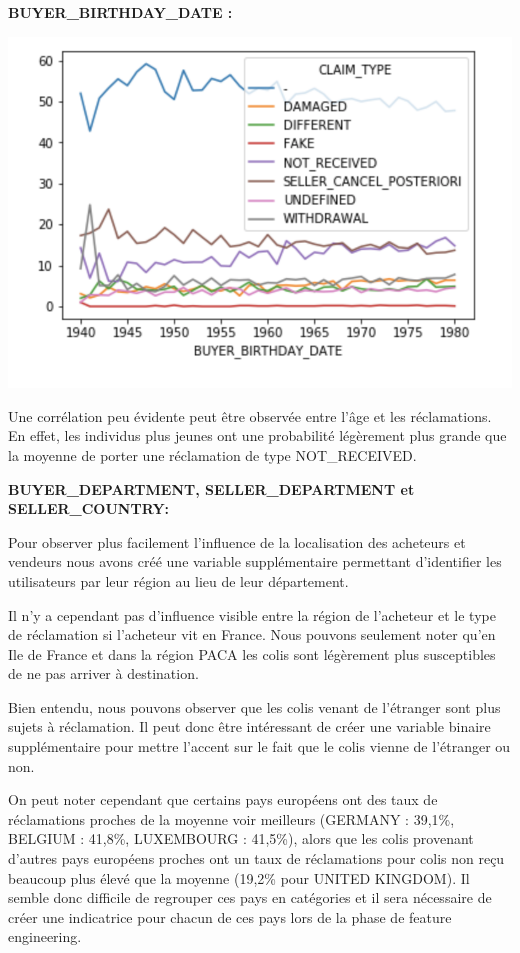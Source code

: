 \textbf{BUYER_BIRTHDAY_DATE :}

\begin{center}
\includegraphics[scale=0.5]{assets/age} 
\end{center}

Une corrélation peu évidente peut être observée entre l'âge et les réclamations. 
En effet, les individus plus jeunes ont une probabilité légèrement plus grande que la moyenne
de porter une réclamation de type NOT_RECEIVED.

\textbf{BUYER_DEPARTMENT, SELLER_DEPARTMENT et SELLER_COUNTRY:}

Pour observer plus facilement l'influence de la localisation des acheteurs et vendeurs
nous avons créé une variable supplémentaire permettant d'identifier les utilisateurs par leur
région au lieu de leur département. 

Il n'y a cependant pas d'influence visible entre la région de l'acheteur et le type de
réclamation si l'acheteur vit en France. Nous pouvons seulement noter qu'en Ile de France
et dans la région PACA les colis sont légèrement plus susceptibles de ne pas arriver
à destination.

Bien entendu, nous pouvons observer que les colis venant de l'étranger sont plus sujets à 
réclamation. Il peut donc être intéressant de créer une variable binaire supplémentaire 
pour mettre l'accent sur le fait que le colis vienne de l'étranger ou non.

On peut noter cependant que certains pays européens ont des taux de réclamations 
proches de la moyenne voir meilleurs (GERMANY : 39,1\%, BELGIUM : 41,8\%, LUXEMBOURG : 41,5\%),
alors que les colis provenant d'autres pays européens proches ont un taux de réclamations pour colis 
non reçu beaucoup plus élevé que la moyenne (19,2\% pour UNITED KINGDOM). 
Il semble donc difficile de regrouper ces pays en catégories et il sera nécessaire de créer
une indicatrice pour chacun de ces pays lors de la phase de feature engineering.

